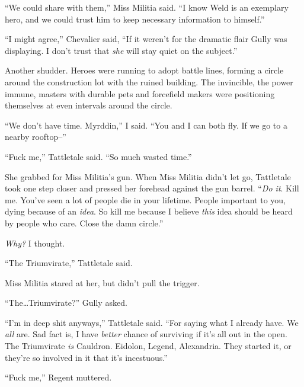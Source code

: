 ``We could share with them,'' Miss Militia said.  ``I know Weld is an exemplary hero, and we could trust him to keep necessary information to himself.''



``I might agree,'' Chevalier said, ``If it weren't for the dramatic flair Gully was displaying.  I don't trust that \emph{she} will stay quiet on the subject.''



Another shudder.  Heroes were running to adopt battle lines, forming a circle around the construction lot with the ruined building.  The invincible, the power immune, masters with durable pets and forcefield makers were positioning themselves at even intervals around the circle.



``We don't have time.  Myrddin,'' I said. ``You and I can both fly.  If we go to a nearby rooftop--''



``Fuck me,'' Tattletale said.  ``So much wasted time.''



She grabbed for Miss Militia's gun.  When Miss Militia didn't let go, Tattletale took one step closer and pressed her forehead against the gun barrel.  ``\emph{Do it}.  Kill me.  You've seen a lot of people die in your lifetime.  People important to you, dying because of an \emph{idea}.  So kill me because I believe \emph{this} idea should be heard by people who care.  Close the damn circle.''



\emph{Why?} I thought.



``The Triumvirate,'' Tattletale said.



Miss Militia stared at her, but didn't pull the trigger.



``The\ldots Triumvirate?'' Gully asked.



``I'm in deep shit anyways,'' Tattletale said.  ``For saying what I already have.  We \emph{all} are.  Sad fact is, I have \emph{better }chance of surviving if it's all out in the open.  The Triumvirate \emph{is} Cauldron.  Eidolon, Legend, Alexandria.  They started it, or they're so involved in it that it's incestuous.''



``Fuck me,'' Regent muttered.



